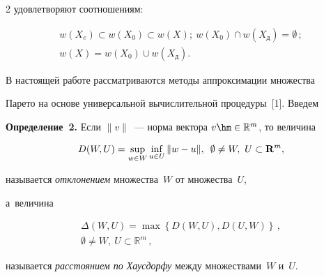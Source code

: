 \begin{multicols}{2}
удовлетворяют соотношениям:





\noindent


\begin{multline*}


 w(X_{e}) \subset  w(X_{0}) \subset w(X);\


w(X_0)\cap  w(X_{\mathrm{д}})=\emptyset\,;\\


w(X)=w(X_0)\cup w (X_{\mathrm{д}}).


\end{multline*}


  


  В настоящей работе рассматриваются методы аппроксимации множества 


Парето на основе универсальной вычислительной процедуры~[1]. Введем


  


\pagebreak


  


  \noindent


  \textbf{Определение~2.} Если $\| v\|$~--- норма вектора $v\hm\in 


\mathbb{R}^m$, то величина


  $$


  D(W,U)=\sup\limits_{w\in W} \mathop{\mathrm{inf}}\limits_{u\in U} \| w-


u\|,\enskip \emptyset \not= W,\ U\subset \mathbf{R}^m,


  $$


называется \textit{отклонением} множества~$W$ от множества~$U$, 


а~величина


\begin{multline*}


\Delta (W,U) =\max\left\{ D(W,U), D(U,W)\right\}\,,\\


 \emptyset\not= W,\ U\subset \mathbb{R}^m\,,


\end{multline*}


называется \textit{расстоянием по Хаусдорфу} между множествами~$W$ и~$U$.





\smallskip



\end{multicols}
